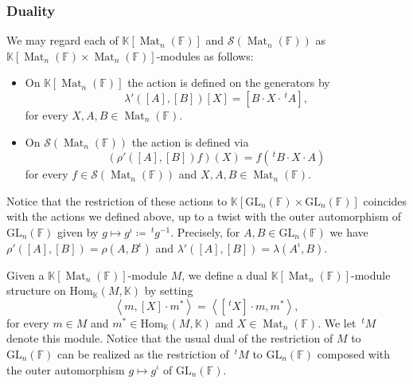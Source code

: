 \documentclass[12pt, reqno]{amsart}
\theoremstyle{definition}
\newcommand{\coefficientsField}{\mathbb{K}}
\newcommand{\Hom}{\mathrm{Hom}}
\newcommand{\transpose}[1]{\, {}^{t}#1}
\newcommand{\innerproduct}[2]{\left\langle #1,#2\right\rangle}
\newcommand{\GL}{\mathrm{GL}}
\newcommand{\finiteField}{\mathbb{F}}
\newcommand{\squareMatrix}{\operatorname{Mat}}
\newcommand{\Schwartz}{\mathcal{S}}
\begin{document}
\subsubsection{Duality}
We may regard each of $\coefficientsField\left[\squareMatrix_n\left(\finiteField\right)\right]$ and $\Schwartz\left(\squareMatrix_n\left(\finiteField\right)\right)$ as $\coefficientsField\left[\squareMatrix_n\left(\finiteField\right) \times \squareMatrix_n\left(\finiteField\right)\right]$-modules as follows:
\begin{itemize}
	\item On $\coefficientsField\left[\squareMatrix_n\left(\finiteField\right)\right]$ the action is defined on the generators by
	\begin{displaymath}
		\lambda'\left(\left[A\right],\left[B\right]\right)\left[X\right] = \left[B \cdot X \cdot \transpose{A}\right],
	\end{displaymath}
	for every $X,A,B \in \squareMatrix_n\left(\finiteField\right)$.
	\item On $\Schwartz\left(\squareMatrix_n\left(\finiteField\right)\right)$ the action is defined via
	\begin{displaymath}
		\left(\rho'\left(\left[A\right],\left[B\right]\right)f\right)\left(X\right) = f\left(\transpose{B} \cdot X \cdot A\right)
	\end{displaymath}
	for every $f \in \Schwartz\left(\squareMatrix_n\left(\finiteField\right)\right)$ and $X,A,B \in \squareMatrix_n\left(\finiteField\right)$.
\end{itemize}
Notice that the restriction of these actions to $\coefficientsField\left[\GL_n\left(\finiteField\right) \times \GL_n\left(\finiteField\right)\right]$ coincides with the actions we defined above, up to a twist with the outer automorphism of $\GL_n\left(\finiteField\right)$ given by $g \mapsto g^{\iota} \coloneq \transpose{g}^{-1}$. Precisely, for $A, B \in \GL_n\left(\finiteField\right)$ we have $\rho'\left(\left[A\right],\left[B\right]\right) = \rho\left(A,B^{\iota}\right)$ and $\lambda'\left(\left[A\right],\left[B\right]\right) = \lambda\left(A^{\iota},B\right)$.

Given a $\coefficientsField\left[\squareMatrix_n\left(\finiteField\right)\right]$-module $M$, we define a dual $\coefficientsField\left[\squareMatrix_n\left(\finiteField\right)\right]$-module structure on $\Hom_{\coefficientsField}\left(M, \coefficientsField\right)$ by setting \begin{displaymath}
	\innerproduct{m}{\left[X\right] \cdot m^{\ast}} = \innerproduct{\left[\transpose{X}\right] \cdot m}{m^{\ast}},
\end{displaymath} for every $m \in M$ and $m^{\ast} \in \Hom_{\coefficientsField}\left(M, \coefficientsField\right)$ and $X \in \squareMatrix_n\left(\finiteField\right)$. We let $\transpose{M}$ denote this module. Notice that the usual dual of the restriction of $M$ to $\GL_n\left(\finiteField\right)$ can be realized as the restriction of $\transpose{M}$ to $\GL_n\left(\finiteField\right)$ composed with the outer automorphism $g \mapsto g^{\iota}$ of $\GL_n\left(\finiteField\right)$.
\end{document}
